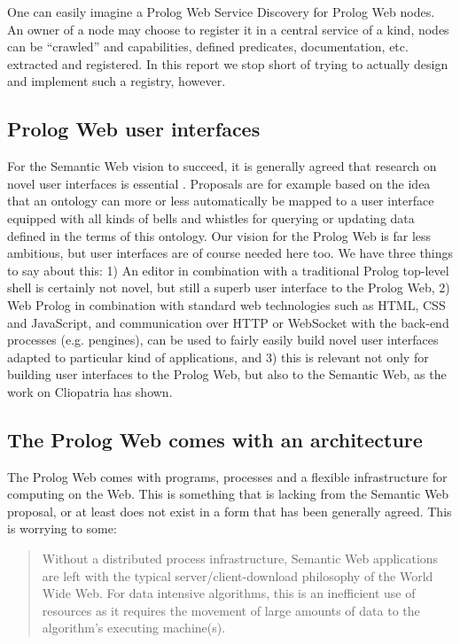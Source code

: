 \documentclass{tlp}
\begin{document}
\noindent One can easily imagine a Prolog Web Service Discovery for Prolog Web nodes. An owner of a node may choose to register it in a central service of a kind, nodes can be ``crawled'' and capabilities, defined predicates, documentation, etc. extracted and registered. In this report we stop short of trying to actually design and implement such a registry, however.


\subsection{Prolog Web user interfaces}\label{sec:prolog-web-user-interfaces}

\noindent For the Semantic Web vision to succeed, it is generally agreed that research on novel user interfaces is essential \cite{Gasevic12semanticweb}. Proposals are for example based on the idea that an ontology can more or less automatically be mapped to a user interface equipped with all kinds of bells and whistles for querying or updating data defined in the terms of this ontology. Our vision for the Prolog Web is far less ambitious, but user interfaces are of course needed here too. We have three things to say about this: 1) An editor in combination with a traditional Prolog top-level shell is certainly not novel, but still a superb user interface to the Prolog Web, 2) Web Prolog in combination with standard web technologies such as HTML, CSS and JavaScript, and communication over HTTP or WebSocket with the back-end processes (e.g. pengines), can be used to fairly easily build novel user interfaces adapted to particular kind of applications, and 3) this is relevant not only for building user interfaces to the Prolog Web, but also to the Semantic Web, as the work on Cliopatria has shown. 


\subsection{The Prolog Web comes with an architecture}\label{sec:architecture}

\noindent The Prolog Web comes with programs, processes and a flexible infrastructure for computing on the Web. This is something that is lacking from the Semantic Web proposal, or at least does not exist in a form that has been generally agreed. This is worrying to some: 

\begin{quote}
Without a distributed process infrastructure, Semantic Web applications are left with the typical server/client-download philosophy of the World Wide Web. For data intensive algorithms, this is an inefficient use of resources as it requires the movement of large amounts of data to the algorithm's executing machine(s).
\end{quote}
\end{document}
